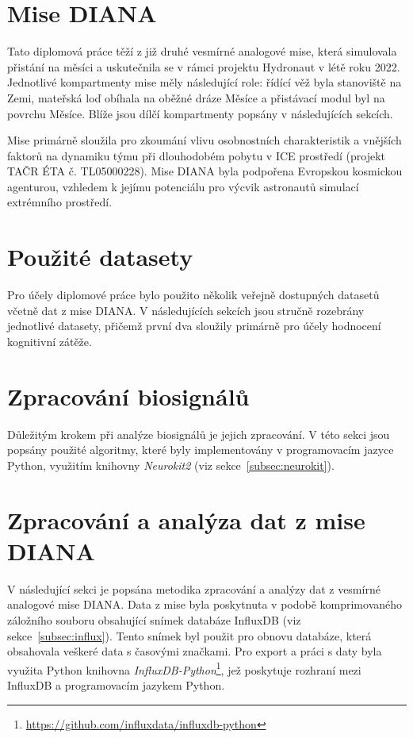 \section{Mise DIANA}
\label{sec:mise_diana}
Tato diplomová práce těží z již druhé vesmírné analogové mise, která simulovala
přistání na měsíci a uskutečnila se v rámci projektu Hydronaut v létě roku 2022.
Jednotlivé kompartmenty mise měly následující role: řídící věž byla stanoviště
na Zemi, mateřská loď obíhala na oběžné dráze Měsíce a přistávací modul byl na
povrchu Měsíce. Blíže jsou dílčí kompartmenty popsány v následujících sekcích.

Mise primárně sloužila pro zkoumání vlivu osobnostních charakteristik a vnějších
faktorů na dynamiku týmu při dlouhodobém pobytu v \gls{ICE} prostředí (projekt
TAČR ÉTA č. TL05000228). Mise DIANA byla podpořena Evropskou kosmickou
agenturou, vzhledem k jejímu potenciálu pro výcvik astronautů simulací
extrémního prostředí. 


\section{Použité datasety}
\label{sec:datasety}
Pro účely diplomové práce bylo použito několik veřejně dostupných datasetů
včetně dat z mise DIANA. V následujících sekcích jsou stručně rozebrány
jednotlivé datasety, přičemž první dva sloužily primárně pro účely hodnocení
kognitivní zátěže.


\section{Zpracování biosignálů}
\label{sec:zpracovani_biosignalu}
Důležitým krokem při analýze biosignálů je jejich zpracování. V této sekci jsou
popsány použité algoritmy, které byly implementovány v programovacím jazyce
Python, využitím knihovny \textit{Neurokit2} (viz sekce~\ref{subsec:neurokit}).


\section{Zpracování a analýza dat z mise DIANA}
V následující sekci je popsána metodika zpracování a analýzy dat z vesmírné
analogové mise DIANA. Data z mise byla poskytnuta v podobě komprimovaného
záložního souboru obsahující snímek databáze InfluxDB (viz
sekce~\ref{subsec:influx}). Tento snímek byl použit pro obnovu databáze, která
obsahovala veškeré data s časovými značkami. Pro export a práci s daty byla
využita Python knihovna
\textit{InfluxDB-Python}\footnote{\url{https://github.com/influxdata/influxdb-python}},
jež poskytuje rozhraní mezi InfluxDB a programovacím jazykem Python. 
\label{sec:zpracovani_dat_diana}


